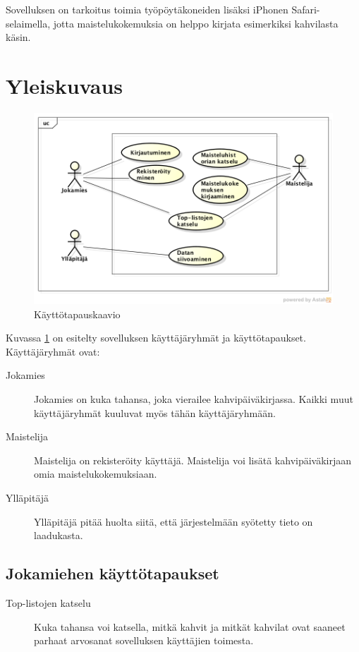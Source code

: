 \documentclass[a4paper,titlepage]{article}
\begin{document}
Sovelluksen on tarkoitus toimia työpöytäkoneiden lisäksi iPhonen
Safari-selaimella, jotta maistelukokemuksia on helppo kirjata
esimerkiksi kahvilasta käsin.

\section{Yleiskuvaus}

\begin{figure}[ht]
  \includegraphics[width=12cm]{usecase}
  \caption{Käyttötapauskaavio}
  \label{fig:käyttötapaus}
\end{figure}

Kuvassa \ref{fig:käyttötapaus} on esitelty sovelluksen käyttäjäryhmät
ja käyttötapaukset. Käyttäjäryhmät ovat:

\begin{description}
\item[Jokamies] Jokamies on kuka tahansa, joka vierailee
  kahvipäiväkirjassa. Kaikki muut käyttäjäryhmät kuuluvat myös tähän
  käyttäjäryhmään.

\item[Maistelija] Maistelija on rekisteröity käyttäjä. Maistelija voi
  lisätä kahvipäiväkirjaan omia maistelukokemuksiaan.

\item[Ylläpitäjä] Ylläpitäjä pitää huolta siitä, että järjestelmään
  syötetty tieto on laadukasta.
\end{description}

\subsection{Jokamiehen käyttötapaukset}

\begin{description}
\item[Top-listojen katselu] Kuka tahansa voi katsella, mitkä kahvit ja
  mitkät kahvilat ovat saaneet parhaat arvosanat sovelluksen
  käyttäjien toimesta.
\end{description}
\end{document}
